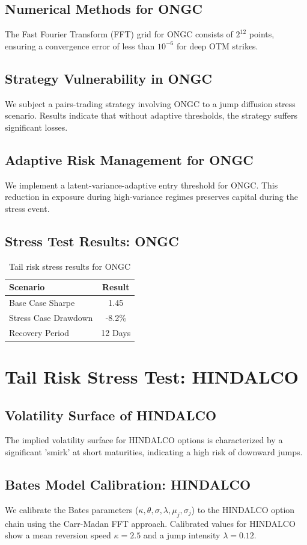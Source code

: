 \documentclass[12pt,a4paper,twoside]{article}
\begin{document}
\subsection{Numerical Methods for ONGC}
The Fast Fourier Transform (FFT) grid for ONGC consists of $2^{12}$ points, ensuring a convergence error of less than $10^{-6}$ for deep OTM strikes.
\subsection{Strategy Vulnerability in ONGC}
We subject a pairs-trading strategy involving ONGC to a jump diffusion stress scenario. Results indicate that without adaptive thresholds, the strategy suffers significant losses.
\subsection{Adaptive Risk Management for ONGC}
We implement a latent-variance-adaptive entry threshold for ONGC. This reduction in exposure during high-variance regimes preserves capital during the stress event.
\subsection{Stress Test Results: ONGC}
\begin{table}[H]
\centering
\begin{tabular}{|l|c|}
\hline
Scenario & Result \\
\hline
Base Case Sharpe & 1.45 \\
Stress Case Drawdown & -8.2\% \\
Recovery Period & 12 Days \\
\hline
\end{tabular}
\caption{Tail risk stress results for ONGC}
\end{table}
\newpage

\section{Tail Risk Stress Test: HINDALCO}
\subsection{Volatility Surface of HINDALCO}
The implied volatility surface for HINDALCO options is characterized by a significant 'smirk' at short maturities, indicating a high risk of downward jumps.
\subsection{Bates Model Calibration: HINDALCO}
We calibrate the Bates parameters ($\kappa, \theta, \sigma, \lambda, \mu_j, \sigma_j$) to the HINDALCO option chain using the Carr-Madan FFT approach.
Calibrated values for HINDALCO show a mean reversion speed $\kappa = 2.5$ and a jump intensity $\lambda = 0.12$.
\end{document}
